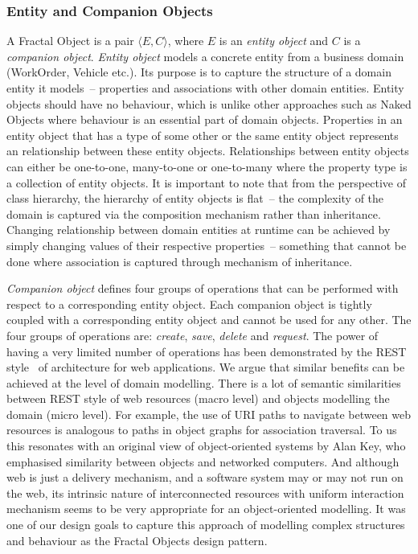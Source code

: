   \subsubsection{Entity and Companion Objects}
  
  A Fractal Object is a pair $\langle E, C\rangle$, where $E$ is an \emph{entity object} and $C$ is a \emph{companion object}.
  \emph{Entity object} models a concrete entity from a business domain (WorkOrder, Vehicle etc.).
  Its purpose is to capture the structure of a domain entity it models~-- properties and associations with other domain entities.  
  Entity objects should have no behaviour, which is unlike other approaches such as Naked Objects where behaviour is an essential part of domain objects.
  Properties in an entity object that has a type of some other or the same entity object represents an relationship between these entity objects.
  Relationships between entity objects can either be one-to-one, many-to-one or one-to-many where the property type is a collection of entity objects.
  It is important to note that from the perspective of class hierarchy, the hierarchy of entity objects is flat~-- the complexity of the domain is captured via the composition mechanism rather than inheritance.  
  Changing relationship between domain entities at runtime can be achieved by simply changing values of their respective properties~-- something that cannot be done where association is captured through mechanism of inheritance.
  
  \emph{Companion object} defines four groups of operations that can be performed with respect to a corresponding entity object.  
  Each companion object is tightly coupled with a corresponding entity object and cannot be used for any other.
  The four groups of operations are: \emph{create}, \emph{save}, \emph{delete} and \emph{request}.
  The power of having a very limited number of operations has been demonstrated by the REST style~\cite{Fie2000} of architecture for web applications.
  We argue that similar benefits can be achieved at the level of domain modelling.
  There is a lot of semantic similarities between REST style of web resources (macro level) and objects modelling the domain (micro level).
  For example, the use of URI paths to navigate between web resources is analogous to paths in object graphs for association traversal.
  To us this resonates with an original view of object-oriented systems by Alan Key, who emphasised similarity between objects and networked computers.
  And although web is just a delivery mechanism, and a software system may or may not run on the web, its intrinsic nature of interconnected resources with uniform interaction mechanism seems to be very appropriate for an object-oriented modelling.
  It was one of our design goals to capture this approach of modelling complex structures and behaviour as the Fractal Objects design pattern.

